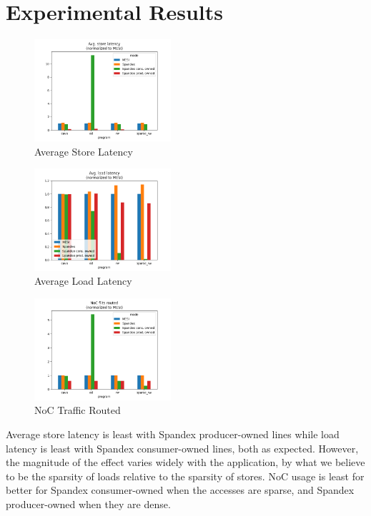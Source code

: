 \section{Experimental Results}

\begin{figure}[h]
    \centering
    \includegraphics[width=0.45\textwidth]{stores.png}
    \caption{Average Store Latency}
    \label{fig:stores}
\end{figure}

\begin{figure}[h]
    \centering
    \includegraphics[width=0.45\textwidth]{loads.png}
    \caption{Average Load Latency}
    \label{fig:loads}
\end{figure}

\begin{figure}[h]
    \centering
    \includegraphics[width=0.45\textwidth]{traffic.png}
    \caption{NoC Traffic Routed}
    \label{fig:traffic}
\end{figure}

Average store latency is least with Spandex producer-owned lines while load latency is least with Spandex consumer-owned lines, both as expected. However, the magnitude of the effect varies widely with the application, by what we believe to be the sparsity of loads relative to the sparsity of stores. NoC usage is least for better for Spandex consumer-owned when the accesses are sparse, and Spandex producer-owned when they are dense.

